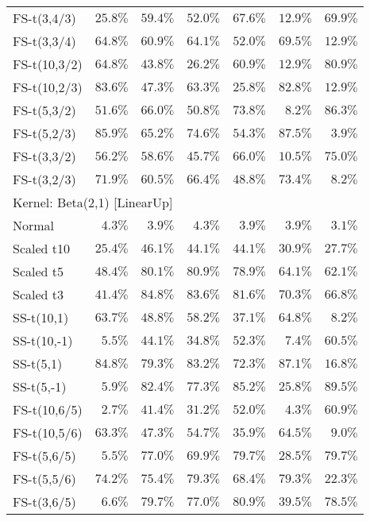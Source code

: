 \begin{longtable}{lrrrrrr}
FS-t(3,4/3) & $25.8\%$ & $59.4\%$ & $52.0\%$ & $67.6\%$ & $12.9\%$ & $69.9\%$ \\ 
FS-t(3,3/4) & $64.8\%$ & $60.9\%$ & $64.1\%$ & $52.0\%$ & $69.5\%$ & $12.9\%$ \\ 
FS-t(10,3/2) & $64.8\%$ & $43.8\%$ & $26.2\%$ & $60.9\%$ & $12.9\%$ & $80.9\%$ \\ 
FS-t(10,2/3) & $83.6\%$ & $47.3\%$ & $63.3\%$ & $25.8\%$ & $82.8\%$ & $12.9\%$ \\ 
FS-t(5,3/2) & $51.6\%$ & $66.0\%$ & $50.8\%$ & $73.8\%$ & $8.2\%$ & $86.3\%$ \\ 
FS-t(5,2/3) & $85.9\%$ & $65.2\%$ & $74.6\%$ & $54.3\%$ & $87.5\%$ & $3.9\%$ \\ 
FS-t(3,3/2) & $56.2\%$ & $58.6\%$ & $45.7\%$ & $66.0\%$ & $10.5\%$ & $75.0\%$ \\ 
FS-t(3,2/3) & $71.9\%$ & $60.5\%$ & $66.4\%$ & $48.8\%$ & $73.4\%$ & $8.2\%$ \\ 
\midrule
\multicolumn{7}{l}{Kernel: Beta(2,1) [LinearUp]} \\ 
\midrule
Normal & $4.3\%$ & $3.9\%$ & $4.3\%$ & $3.9\%$ & $3.9\%$ & $3.1\%$ \\ 
Scaled t10 & $25.4\%$ & $46.1\%$ & $44.1\%$ & $44.1\%$ & $30.9\%$ & $27.7\%$ \\ 
Scaled t5 & $48.4\%$ & $80.1\%$ & $80.9\%$ & $78.9\%$ & $64.1\%$ & $62.1\%$ \\ 
Scaled t3 & $41.4\%$ & $84.8\%$ & $83.6\%$ & $81.6\%$ & $70.3\%$ & $66.8\%$ \\ 
SS-t(10,1) & $63.7\%$ & $48.8\%$ & $58.2\%$ & $37.1\%$ & $64.8\%$ & $8.2\%$ \\ 
SS-t(10,-1) & $5.5\%$ & $44.1\%$ & $34.8\%$ & $52.3\%$ & $7.4\%$ & $60.5\%$ \\ 
SS-t(5,1) & $84.8\%$ & $79.3\%$ & $83.2\%$ & $72.3\%$ & $87.1\%$ & $16.8\%$ \\ 
SS-t(5,-1) & $5.9\%$ & $82.4\%$ & $77.3\%$ & $85.2\%$ & $25.8\%$ & $89.5\%$ \\ 
FS-t(10,6/5) & $2.7\%$ & $41.4\%$ & $31.2\%$ & $52.0\%$ & $4.3\%$ & $60.9\%$ \\ 
FS-t(10,5/6) & $63.3\%$ & $47.3\%$ & $54.7\%$ & $35.9\%$ & $64.5\%$ & $9.0\%$ \\ 
FS-t(5,6/5) & $5.5\%$ & $77.0\%$ & $69.9\%$ & $79.7\%$ & $28.5\%$ & $79.7\%$ \\ 
FS-t(5,5/6) & $74.2\%$ & $75.4\%$ & $79.3\%$ & $68.4\%$ & $79.3\%$ & $22.3\%$ \\ 
FS-t(3,6/5) & $6.6\%$ & $79.7\%$ & $77.0\%$ & $80.9\%$ & $39.5\%$ & $78.5\%$ \\ 

\end{longtable}
